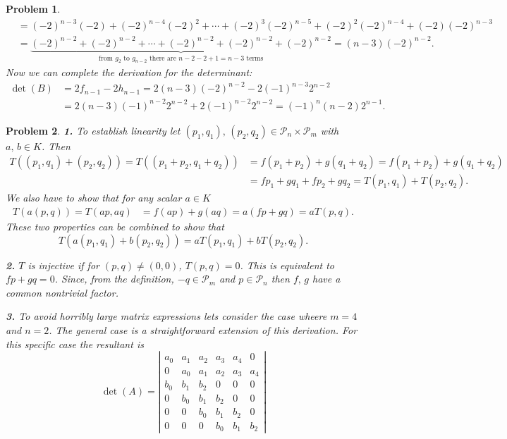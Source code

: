 \documentclass{article}
\newcommand{\subno}[1]{\par\noindent\textbf{#1}}
\newcommand{\cP}{\mathcal{P}}
\theoremstyle{pprop}
\newtheorem{problem}{Problem}[section]
\begin{document}
\begin{problem}
\begin{align*}
& = (-2)^{n-3} (-2) + (-2)^{n-4} (-2)^2 + \cdots + (-2)^3 (-2)^{n-5}  + (-2)^2 (-2)^{n-4} + (-2) (-2)^{n-3} \\
& = \underbrace{(-2)^{n-2} + (-2)^{n-2} + \cdots +  (-2)^{n-2}  + (-2)^{n-2} + (-2)^{n-2}}_{\text{from $g_2$ to $g_{n-2}$ there are $n-2-2+1=n-3$ terms}}
 = (n-3)(-2)^{n-2}.
\end{align*}
Now we can complete the derivation for the determinant:
\begin{align*}
  \det(B) & = 2 f_{n-1} - 2 h_{n-1} = 2 (n-3) (-2)^{n-2} - 2 (-1)^{n-3} 2^{n-2} \\
  & = 2 (n-3) (-1)^{n-2} 2^{n-2} + 2 (-1)^{n-2} 2^{n-2} = (-1)^n (n-2)2^{n-1}.
\end{align*}
\end{problem}
\begin{problem}
\subno{1.} To establish linearity let $(p_1,q_1), \, (p_2,q_2) \in \cP_n \times \cP_m$ with $a,\, b \in K$.
Then 
\begin{align*}
  T((p_1,q_1)+(p_2,q_2)) = T((p_1+p_2,q_1+q_2)) & = f(p_1+p_2)+g(q_1+q_2) = f (p_1+p_2) +g (q_1+q_2) \\
  & = f p_1 + g q_1 + fp_2 + g q_2 = T(p_1,q_1) + T(p_2,q_2). 
\end{align*} 
We also have to show that for any scalar $a \in K$
\begin{align*}
  T(a(p,q))= T(ap,aq) & = f (ap) + g(aq)= a (fp+gq) = a T(p,q).
\end{align*}
These two properties can be combined to show that  
\[
T(a(p_1,q_1)+b(p_2,q_2))=aT(p_1,q_1)+bT(p_2,q_2).
\]
\subno{2.} $T$ is injective if for $(p,q)\neq(0,0)$, $T(p,q)=0$. This is equivalent to $fp+gq=0$. Since,
from the definition, $-q \in \cP_m$ and $p \in \cP_n$ then $f, \, g$ have a common nontrivial factor.
\subno{3.} To avoid horribly large matrix expressions lets consider the case wheere $m=4$ and $n=2$. The general case is a straightforward 
extension of this derivation. For this specific case the resultant is
\[
\det(A)=
\left|\begin{matrix}a_{0} & a_{1} & a_{2} & a_{3} & a_{4} & 0\\
  0 & a_{0} & a_{1} & a_{2} & a_{3} & a_{4}\\
  b_{0} & b_{1} & b_{2} & 0 & 0 & 0\\
  0 & b_{0} & b_{1} & b_{2} & 0 & 0\\
  0 & 0 & b_{0} & b_{1} & b_{2} & 0\\
  0 & 0 & 0 & b_{0} & b_{1} & b_{2}\end{matrix}\right|
\]
\end{problem}
\end{document}
